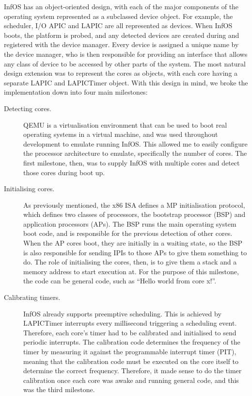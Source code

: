 \documentclass[bsc,frontabs,twoside,singlespacing,parskip,deptreport]{infthesis}     %
\begin{document}
InfOS has an object-oriented design, with each of the major components of the operating system represented as a subclassed device object. For example, the scheduler, I/O APIC and LAPIC are all represented as devices. When InfOS boots, the platform is probed, and any detected devices are created during and registered with the device manager. Every device is assigned a unique name by the device manager, who is then responsible for providing an interface that allows any class of device to be accessed by other parts of the system. The most natural design extension was to represent the cores as objects, with each core having a separate LAPIC and LAPICTimer object. With this design in mind, we broke the implementation down into four main milestones:

\begin{description}
\item [Detecting cores.] QEMU \cite{qemu} is a virtualisation environment that can be used to boot real operating systems in a virtual machine, and was used throughout development to emulate running InfOS. This allowed me to easily configure the processor architecture to emulate, specifically the number of cores. The first milestone, then, was to supply InfOS with multiple cores and detect those cores during boot up.

\item [Initialising cores.] As previously mentioned, the x86 ISA defines a MP initialisation protocol, which defines two classes of processors, the bootstrap processor (BSP) and application processors (APs). The BSP runs the main operating system boot code, and is responsible for the previous detection of other cores. When the AP cores boot, they are initially in a waiting state, so the BSP is also responsible for sending IPIs to those APs to give them something to do. The role of initialising the cores, then, is to give them a stack and a memory address to start execution at. For the purpose of this milestone, the code can be general code, such as “Hello world from core x!”.

\item[Calibrating timers.] InfOS already supports preemptive scheduling. This is achieved by LAPICTimer interrupts every millisecond triggering a scheduling event. Therefore, each core’s timer had to be calibrated and initialised to send periodic interrupts. The calibration code determines the frequency of the timer by measuring it against the programmable interrupt timer (PIT), meaning that the calibration code must be executed on the core itself to determine the correct frequency. Therefore, it made sense to do the timer calibration once each core was awake and running general code, and this was the third milestone.  


\end{description}
\end{document}
